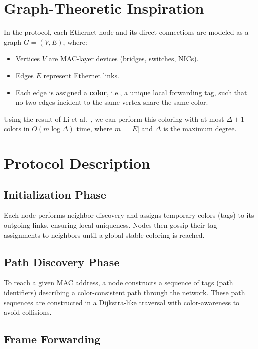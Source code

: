 \documentclass[../OAE-SPEC-MAIN.tex]{subfiles}
\begin{document}
\section{Graph-Theoretic Inspiration}

In the protocol, each Ethernet node and its direct connections are modeled as a graph $G = (V, E)$, where:

\begin{itemize}
    \item Vertices $V$ are MAC-layer devices (bridges, switches, NICs).
    \item Edges $E$ represent Ethernet links.
    \item Each edge is assigned a \textbf{color}, i.e., a unique local forwarding tag, such that no two edges incident to the same vertex share the same color.
\end{itemize}

Using the result of Li et al.~\cite{li2024vizing}, we can perform this coloring with at most $\Delta+1$ colors in $O(m \log \Delta)$ time, where $m = |E|$ and $\Delta$ is the maximum degree.

\section{Protocol Description}

\subsection{Initialization Phase}

Each node performs neighbor discovery and assigns temporary colors (tags) to its outgoing links, ensuring local uniqueness. Nodes then gossip their tag assignments to neighbors until a global stable coloring is reached.

\subsection{Path Discovery Phase}

To reach a given MAC address, a node constructs a sequence of tags (path identifiers) describing a color-consistent path through the network. These path sequences are constructed in a Dijkstra-like traversal with color-awareness to avoid collisions.

\subsection{Frame Forwarding}
\end{document}
